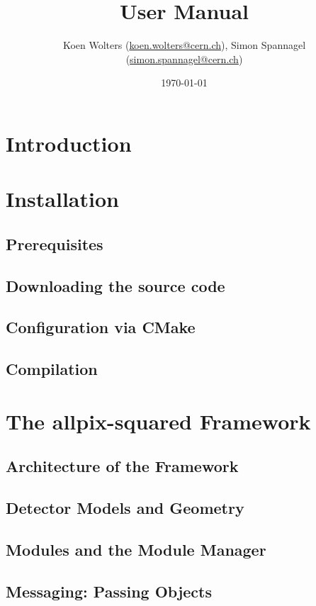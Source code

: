 \documentclass{scrartcl}
\title{\apsq User Manual} %
\author{Koen Wolters (\href{mailto:koen.wolters@cern.ch}{koen.wolters@cern.ch}),
  Simon Spannagel (\href{mailto:simon.spannagel@cern.ch}{simon.spannagel@cern.ch})
} %
\date{\today} %
\begin{document}
\maketitle %


\begin{abstract}
\end{abstract}

\clearpage
\tableofcontents

\clearpage

\section{Introduction}

\section{Installation}
\subsection{Prerequisites}
\subsection{Downloading the source code}
\subsection{Configuration via CMake}
\subsection{Compilation}

\section{The allpix-squared Framework}
\subsection{Architecture of the Framework}
\subsection{Detector Models and Geometry}
\subsection{Modules and the Module Manager}
\subsection{Messaging: Passing Objects}
\end{document}
